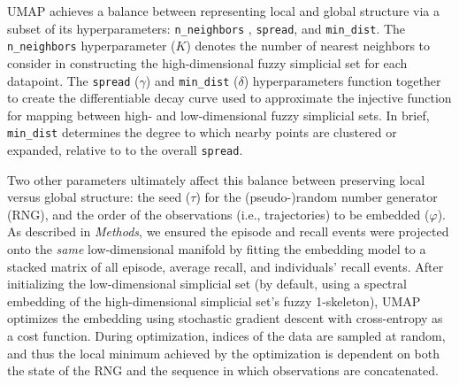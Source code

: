 \documentclass{article}
\begin{document}
UMAP achieves a balance between representing local and global structure via a subset of its hyperparameters: \texttt{n\_neighbors} , \texttt{spread}, and \texttt{min\_dist}.  The \texttt{n\_neighbors} hyperparameter ($K$) denotes the number of nearest neighbors to consider in constructing the high-dimensional fuzzy simplicial set for each datapoint.  The \texttt{spread} ($\gamma$) and \texttt{min\_dist} ($\delta$) hyperparameters function together to create the differentiable decay curve used to approximate the injective function for mapping between high- and low-dimensional fuzzy simplicial sets.  In brief, \texttt{min\_dist} determines the degree to which nearby points are clustered or expanded, relative to to the overall \texttt{spread}.

Two other parameters ultimately affect this balance between preserving local versus global structure: the seed ($\tau$) for the (pseudo-)random number generator (RNG), and the order of the observations (i.e., trajectories) to be embedded ($\varphi$).  As described in \textit{Methods}, we ensured the episode and recall events were projected onto the \textit{same} low-dimensional manifold by fitting the embedding model to a stacked matrix of all episode, average recall, and individuals' recall events.  After initializing the low-dimensional simplicial set (by default, using a spectral embedding of the high-dimensional simplicial set's fuzzy 1-skeleton), UMAP optimizes the embedding using stochastic gradient descent with cross-entropy as a cost function.  During optimization, indices of the data are sampled at random, and thus the local minimum achieved by the optimization is dependent on both the state of the RNG and the sequence in which observations are concatenated.
\end{document}
